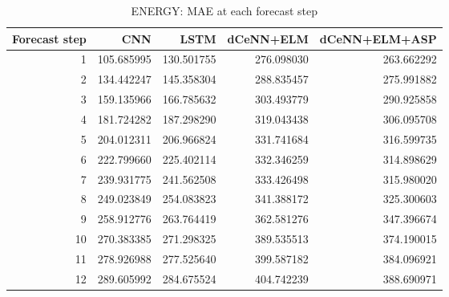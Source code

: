 \begin{table}
\caption{ENERGY: MAE at each forecast step}
\begin{tabular}{rrrrr}
\toprule
Forecast step & CNN & LSTM & dCeNN+ELM & dCeNN+ELM+ASP \\
\midrule
1 & 105.685995 & 130.501755 & 276.098030 & 263.662292 \\
2 & 134.442247 & 145.358304 & 288.835457 & 275.991882 \\
3 & 159.135966 & 166.785632 & 303.493779 & 290.925858 \\
4 & 181.724282 & 187.298290 & 319.043438 & 306.095708 \\
5 & 204.012311 & 206.966824 & 331.741684 & 316.599735 \\
6 & 222.799660 & 225.402114 & 332.346259 & 314.898629 \\
7 & 239.931775 & 241.562508 & 333.426498 & 315.980020 \\
8 & 249.023849 & 254.083823 & 341.388172 & 325.300603 \\
9 & 258.912776 & 263.764419 & 362.581276 & 347.396674 \\
10 & 270.383385 & 271.298325 & 389.535513 & 374.190015 \\
11 & 278.926988 & 277.525640 & 399.587182 & 384.096921 \\
12 & 289.605992 & 284.675524 & 404.742239 & 388.690971 \\
\bottomrule
\end{tabular}
\end{table}
